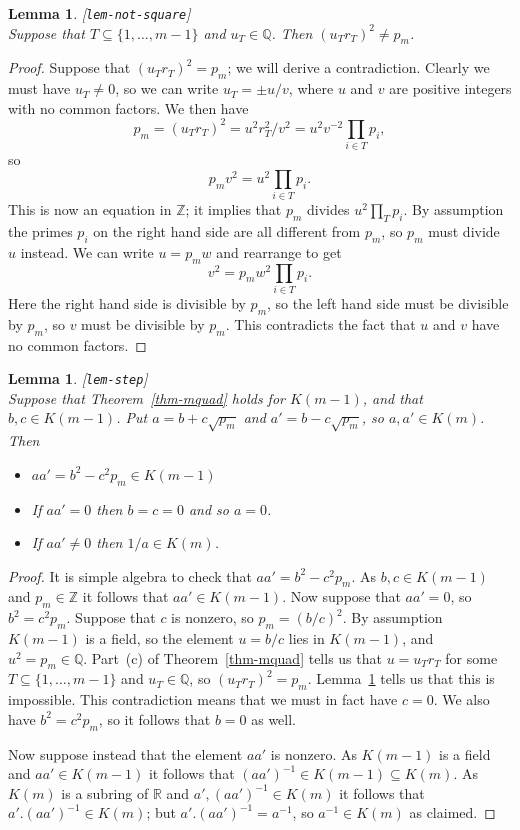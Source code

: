 \documentclass{amsart}
\newcommand{\lbl}[1]{\label{#1}\textup{[\texttt{#1}]}\ \\}
\newcommand{\lbl}{\label}
\newcommand{\Z}         {{\mathbb{Z}}}
\newcommand{\Q}         {{\mathbb{Q}}}
\newcommand{\R}         {{\mathbb{R}}}
\newcommand{\sse}       {\subseteq}
\renewcommand{\:}{\colon}
\newtheorem{lemma}[theorem]{Lemma}
\theoremstyle{definition}
\begin{document}
\begin{lemma}\lbl{lem-not-square}
 Suppose that $T\sse\{1,\dotsc,m-1\}$ and $u_T\in\Q$.  Then
 $(u_Tr_T)^2\neq p_m$.
\end{lemma}
\begin{proof}
 Suppose that $(u_Tr_T)^2=p_m$; we will derive a contradiction.
 Clearly we must have $u_T\neq 0$, so we can write $u_T=\pm u/v$,
 where $u$ and $v$ are positive integers with no common factors.  We
 then have 
 \[ p_m=(u_Tr_T)^2 = u^2r_T^2/v^2=u^2v^{-2}\prod_{i\in T}p_i, \]
 so 
 \[ p_mv^2 = u^2\prod_{i\in T}p_i. \]
 This is now an equation in $\Z$; it implies that $p_m$ divides
 $u^2\prod_Tp_i$.  By assumption the primes $p_i$ on the right hand
 side are all different from $p_m$, so $p_m$ must divide $u$ instead.
 We can write $u=p_mw$ and rearrange to get
 \[ v^2 = p_mw^2\prod_{i\in T}p_i. \]
 Here the right hand side is divisible by $p_m$, so the left hand side
 must be divisible by $p_m$, so $v$ must be divisible by $p_m$.  This
 contradicts the fact that $u$ and $v$ have no common factors.
\end{proof}

\begin{lemma}\lbl{lem-step}
 Suppose that Theorem~\ref{thm-mquad} holds for $K(m-1)$, and that
 $b,c\in K(m-1)$.  Put $a=b+c\sqrt{p_m}$ and $a'=b-c\sqrt{p_m}$, so
 $a,a'\in K(m)$.  Then 
 \begin{itemize}
  \item $aa'=b^2-c^2p_m\in K(m-1)$
  \item If $aa'=0$ then $b=c=0$ and so $a=0$.
  \item If $aa'\neq 0$ then $1/a\in K(m)$.
 \end{itemize}
\end{lemma}
\begin{proof}
 It is simple algebra to check that $aa'=b^2-c^2p_m$.  As
 $b,c\in K(m-1)$ and $p_m\in\Z$ it follows that $aa'\in K(m-1)$.  Now
 suppose that $aa'=0$, so $b^2=c^2p_m$.  Suppose that $c$ is nonzero,
 so $p_m=(b/c)^2$.  By assumption $K(m-1)$ is a field, so the element
 $u=b/c$ lies in $K(m-1)$, and $u^2=p_m\in\Q$.  Part~(c) of
 Theorem~\ref{thm-mquad} tells us that $u=u_Tr_T$ for some
 $T\sse\{1,\dotsc,m-1\}$ and $u_T\in\Q$, so $(u_Tr_T)^2=p_m$.
 Lemma~\ref{lem-not-square} tells us that this is impossible.  This
 contradiction means that we must in fact have $c=0$.  We also have
 $b^2=c^2p_m$, so it follows that $b=0$ as well.

 Now suppose instead that the element $aa'$ is nonzero.  As $K(m-1)$
 is a field and $aa'\in K(m-1)$ it follows that
 $(aa')^{-1}\in K(m-1)\sse K(m)$.  As $K(m)$ is a subring of $\R$ and 
 $a', (aa')^{-1}\in K(m)$ it follows that $a'.(aa')^{-1}\in K(m)$; but
 $a'.(aa')^{-1}=a^{-1}$, so $a^{-1}\in K(m)$ as claimed.
\end{proof}
\end{document}
